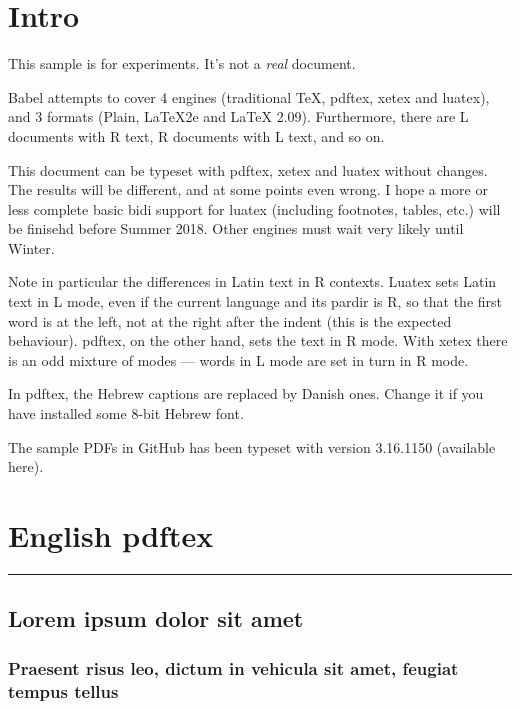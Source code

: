 \documentclass[a4paper]{book}
\newcommand\engine{pdftex}
\newcommand\engine{luatex}
\newcommand\engine{xetex}
\begin{document}
\tableofcontents

\listoffigures


\chapter{Intro}

This sample is for experiments. It's not a \textit{real} document.

Babel attempts to cover 4 engines (traditional \TeX, pdftex, xetex
and luatex), and 3 formats (Plain, \LaTeX 2e and \LaTeX
2.09). Furthermore, there are L documents with R text, R documents
with L text, and so on.

This document can be typeset with pdftex, xetex and luatex without
changes. The results will be different, and at some points even
wrong. I hope a more or less complete basic bidi support for luatex
(including footnotes, tables, etc.) will be finisehd before Summer
2018. Other engines must wait very likely until Winter.

Note in particular the differences in Latin text in R contexts. Luatex
sets Latin text in L mode, even if the current language and its pardir
is R, so that the first word is at the left, not at the right after the
indent (this is the expected behaviour). pdftex, on the other hand,
sets the text in R mode. With xetex there is an odd mixture of modes —
words in L mode are set in turn in R mode.

In pdftex, the Hebrew captions are replaced by Danish ones. Change it
if you have installed some 8-bit Hebrew font.

The sample PDFs in GitHub has been typeset with version 3.16.1150
(available here).

\chapter{English \engine}

\setcounter{section}{25}
\setcounter{table}{34}
\setcounter{page}{56}

\bigskip
\hrule
\bigskip

\section{Lorem ipsum dolor sit amet}
\label{bla}

\subsection{Praesent risus leo, dictum in vehicula sit amet, feugiat
tempus tellus}
\end{document}
